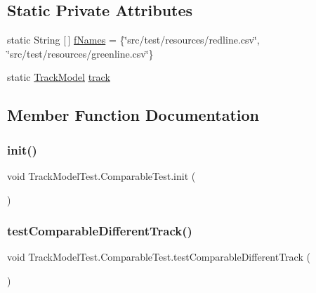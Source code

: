 \subsection*{Static Private Attributes}
\begin{DoxyCompactItemize}
\item 
static String \mbox{[}$\,$\mbox{]} \hyperlink{classTrackModelTest_1_1ComparableTest_a961e3115d8ca99145f56f318368f5582}{f\+Names} = \{\char`\"{}src/test/resources/redline.\+csv\char`\"{}, \char`\"{}src/test/resources/greenline.\+csv\char`\"{}\}
\item 
static \hyperlink{classTrackModel_1_1TrackModel}{Track\+Model} \hyperlink{classTrackModelTest_1_1ComparableTest_aecca898547ff5a1894e5739f9ba69124}{track}
\end{DoxyCompactItemize}


\subsection{Member Function Documentation}
\mbox{\label{classTrackModelTest_1_1ComparableTest_a9f72a396557a4cf1b44c6186e123c1ac}} 
\subsubsection{\texorpdfstring{init()}{init()}}
{\footnotesize\ttfamily void Track\+Model\+Test.\+Comparable\+Test.\+init (\begin{DoxyParamCaption}{ }\end{DoxyParamCaption})\hspace{0.3cm}{\ttfamily [package]}}

\mbox{\label{classTrackModelTest_1_1ComparableTest_af0a95c84e6f6a63d42e110e6987e9b76}} 
\subsubsection{\texorpdfstring{test\+Comparable\+Different\+Track()}{testComparableDifferentTrack()}}
{\footnotesize\ttfamily void Track\+Model\+Test.\+Comparable\+Test.\+test\+Comparable\+Different\+Track (\begin{DoxyParamCaption}{ }\end{DoxyParamCaption})\hspace{0.3cm}{\ttfamily [package]}}



